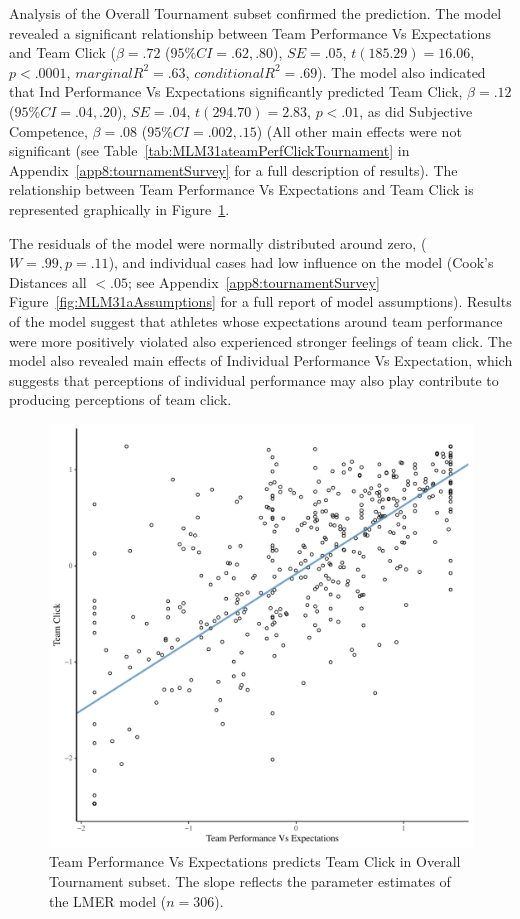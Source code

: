 \begin{CJK}{UTF8}{gbsn}
Analysis of the Overall Tournament subset confirmed the prediction.
The model revealed a significant relationship between Team Performance Vs Expectations and Team Click ($\beta = .72$ ($95\% CI = .62, .80$), $SE = .05$, $t(185.29) = 16.06$, $p < .0001$, $marginal R^2 = .63$, $conditional R^2 = .69$).
The model also indicated that Ind Performance Vs Expectations significantly predicted Team Click, $\beta = .12$ ($95\% CI =  .04, .20$), $SE = .04$, $t(294.70) = 2.83$, $p < .01$, as did Subjective Competence, $\beta = .08$ ($95\% CI =  .002, .15$) (All other main effects were not significant (see Table~\ref{tab:MLM31ateamPerfClickTournament} in Appendix~\ref{app8:tournamentSurvey} for a full description of results).  The relationship between Team Performance Vs Expectations  and Team Click is represented graphically in Figure~\ref{fig:teamPerfClickOverallModelSlope}.

The residuals of the model were normally distributed around zero, ($W = .99, p = .11$), and individual cases had low influence on the model (Cook's Distances all $< .05$; see Appendix~\ref{app8:tournamentSurvey} Figure~\ref{fig:MLM31aAssumptions} for a full report of model assumptions).  Results of the model suggest that athletes whose expectations around team performance were more positively violated also experienced stronger feelings of team click.  The model also revealed main effects of Individual Performance Vs Expectation, which suggests that perceptions of individual performance may also play contribute to producing perceptions of team click.


   \begin{figure}[htbp]
     \centering
   \includegraphics[scale=.5]{images/teamPerfClickOverallModelSlope.pdf}
     \caption{Team Performance Vs Expectations predicts Team Click in Overall Tournament subset.  The slope reflects the parameter estimates of the LMER model ($n = 306$).}
     \label{fig:teamPerfClickOverallModelSlope}
   \end{figure}



\end{CJK}
